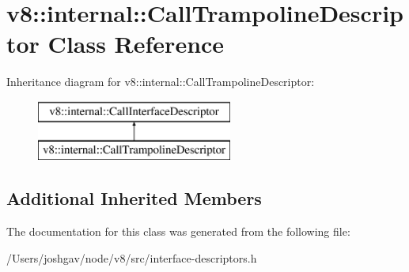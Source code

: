 \hypertarget{classv8_1_1internal_1_1_call_trampoline_descriptor}{}\section{v8\+:\+:internal\+:\+:Call\+Trampoline\+Descriptor Class Reference}
\label{classv8_1_1internal_1_1_call_trampoline_descriptor}
Inheritance diagram for v8\+:\+:internal\+:\+:Call\+Trampoline\+Descriptor\+:\begin{figure}[H]
\begin{center}
\leavevmode
\includegraphics[height=2.000000cm]{classv8_1_1internal_1_1_call_trampoline_descriptor}
\end{center}
\end{figure}
\subsection*{Additional Inherited Members}


The documentation for this class was generated from the following file\+:\begin{DoxyCompactItemize}
\item 
/\+Users/joshgav/node/v8/src/interface-\/descriptors.\+h\end{DoxyCompactItemize}
